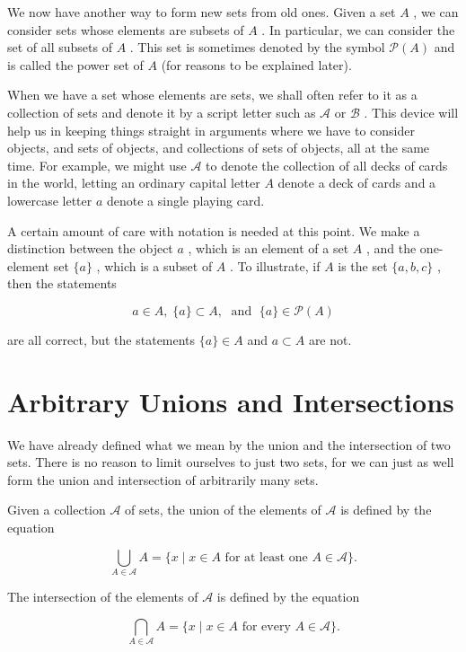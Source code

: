 We now have another way to form new sets from old ones. Given a set \(A\) , we can consider sets whose elements are subsets of \(A\) . In particular, we can consider the set of all subsets of \(A\) . This set is sometimes denoted by the symbol \(\mathcal{P}\left( A\right)\) and is called the power set of \(A\) (for reasons to be explained later).

When we have a set whose elements are sets, we shall often refer to it as a collection of sets and denote it by a script letter such as \(\mathcal{A}\) or \(\mathcal{B}\) . This device will help us in keeping things straight in arguments where we have to consider objects, and sets of objects, and collections of sets of objects, all at the same time. For example, we might use \(\mathcal{A}\) to denote the collection of all decks of cards in the world, letting an ordinary capital letter \(A\) denote a deck of cards and a lowercase letter \(a\) denote a single playing card.

A certain amount of care with notation is needed at this point. We make a distinction between the object \(a\) , which is an element of a set \(A\) , and the one-element set \(\{ a\}\) , which is a subset of \(A\) . To illustrate, if \(A\) is the set \(\{ a,b,c\}\) , then the statements

\[
a \in  A,\;\{ a\}  \subset  A,\;\text{ and }\;\{ a\}  \in  \mathcal{P}\left( A\right)
\]

are all correct, but the statements \(\{ a\}  \in  A\) and \(a \subset  A\) are not.

\section*{Arbitrary Unions and Intersections}

We have already defined what we mean by the union and the intersection of two sets. There is no reason to limit ourselves to just two sets, for we can just as well form the union and intersection of arbitrarily many sets.

Given a collection \(\mathcal{A}\) of sets, the union of the elements of \(\mathcal{A}\) is defined by the equation

\[
\mathop{\bigcup }\limits_{{A \in  \mathcal{A}}}A = \{ x \mid  x \in  A\text{ for at least one }A \in  \mathcal{A}\} .
\]

The intersection of the elements of \(\mathcal{A}\) is defined by the equation

\[
\mathop{\bigcap }\limits_{{A \in  \mathcal{A}}}A = \{ x \mid  x \in  A\text{ for every }A \in  \mathcal{A}\} .
\]

